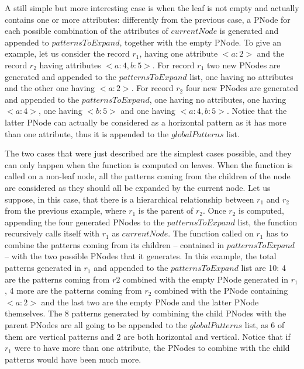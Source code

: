 \documentclass{acm_proc_article-sp-sigmod09}
\begin{document}
A still simple but more interesting case is when the leaf is not empty and actually contains one or more attributes: differently from the previous case, a PNode for each possible combination of the attributes of $currentNode$ is generated and appended to $patternsToExpand$, together with the empty PNode.  To give an example, let us consider the record $r_1$, having one attribute $<a \colon 2>$ and the record $r_2$ having attributes $<a \colon 4, b \colon 5>$. For record $r_1$ two new PNodes are generated and appended to the $patternsToExpand$ list, one having no attributes and the other one having $<a \colon 2>$. For record $r_2$ four new PNodes are generated and appended to the $patternsToExpand$, one having no attributes, one having $<a \colon 4>$, one having $<b \colon 5>$ and one having $<a \colon 4, b \colon 5>$. Notice that the latter PNode can actually be considered as a horizontal pattern as it has more than one attribute, thus it is appended to the $globalPatterns$ list. 

The two cases that were just described are the simplest cases possible, and they can only happen when the function is computed on leaves. When the function is called on a non-leaf node, all the patterns coming from the children of the node are considered as they should all be expanded by the current node. Let us suppose, in this case, that there is a hierarchical relationship between $r_1$ and $r_2$ from the previous example, where $r_1$ is the parent of $r_2$. Once $r_2$ is computed, appending the four generated PNodes to the $patternsToExpand$ list, the function recursively calls itself with $r_1$ as $currentNode$. The function called on $r_1$ has to combine the patterns coming from its children -- contained in $patternsToExpand$ -- with the two possible PNodes that it generates. In this example, the total patterns generated in $r_1$ and appended to the $patternsToExpand$ list are 10: 4 are the patterns coming from $r2$ combined with the empty PNode generated in $r_1$, 4 more are the patterns coming from $r_2$ combined with the PNode containing $<a \colon 2>$ and the last two are the empty PNode and the latter PNode themselves. The 8 patterns generated by combining the child PNodes with the parent PNodes are all going to be appended to the $globalPatterns$ list, as 6 of them are vertical patterns and 2 are both horizontal and vertical. Notice that if $r_1$ were to have more than one attribute, the PNodes to combine with the child patterns would have been much more.
\end{document}
